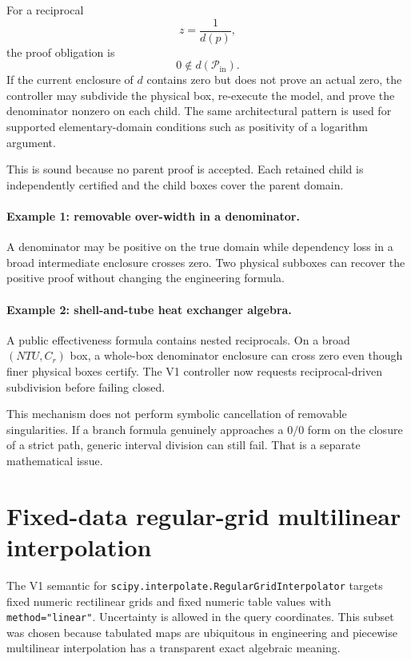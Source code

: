\documentclass[11pt]{article}
\newcommand{\Pin}{\mathcal{P}_{\mathrm{in}}}
\begin{document}
For a reciprocal
\[
  z=\frac{1}{d(p)},
\]
the proof obligation is
\[
  0\notin d(\Pin).
\]
If the current enclosure of \(d\) contains zero but does not prove an actual
zero, the controller may subdivide the physical box, re-execute the model, and
prove the denominator nonzero on each child.  The same architectural pattern is
used for supported elementary-domain conditions such as positivity of a logarithm
argument.

This is sound because no parent proof is accepted.  Each retained child is
independently certified and the child boxes cover the parent domain.

\paragraph{Example 1: removable over-width in a denominator.}
A denominator may be positive on the true domain while dependency loss in a broad
intermediate enclosure crosses zero.  Two physical subboxes can recover the
positive proof without changing the engineering formula.

\paragraph{Example 2: shell-and-tube heat exchanger algebra.}
A public effectiveness formula contains nested reciprocals.  On a broad
\((NTU,C_r)\) box, a whole-box denominator enclosure can cross zero even though
finer physical boxes certify.  The V1 controller now requests reciprocal-driven
subdivision before failing closed.

This mechanism does not perform symbolic cancellation of removable singularities.
If a branch formula genuinely approaches a \(0/0\) form on the closure of a
strict path, generic interval division can still fail.  That is a separate
mathematical issue.

\section{Fixed-data regular-grid multilinear interpolation}

The V1 semantic for \texttt{scipy.interpolate.RegularGridInterpolator} targets
fixed numeric rectilinear grids and fixed numeric table values with
\texttt{method="linear"}.  Uncertainty is allowed in the query coordinates.
This subset was chosen because tabulated maps are ubiquitous in engineering and
piecewise multilinear interpolation has a transparent exact algebraic meaning.
\end{document}
